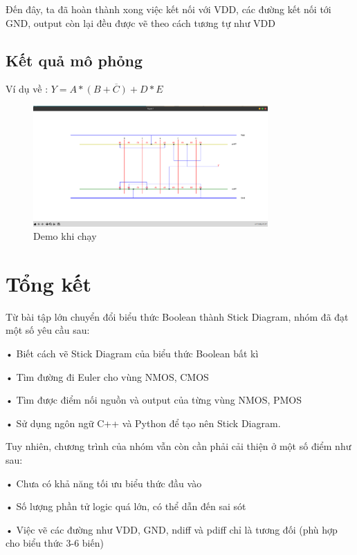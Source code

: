 \documentclass[a4paper,12pt]{article}
\begin{document}
Đến đây, ta đã hoàn thành xong việc kết nối với VDD, các đường kết nối tới GND, output còn lại đều được vẽ theo cách tương tự như VDD
\subsection{Kết quả mô phỏng}
Ví dụ về : \( Y = \overline{A *(B + C) + D * E} \)

\begin{figure}[H]
    \centering
    \includegraphics[width=0.8\textwidth]{../PNG/DEMO_Real.png}
    \caption{Demo khi chạy}
    \label{fig:DEMO}
\end{figure}
\newpage
\section{Tổng kết}
Từ bài tập lớn chuyển đổi biểu thức Boolean thành Stick Diagram, nhóm đã đạt một số yêu cầu sau:

• Biết cách vẽ Stick Diagram của biểu thức Boolean bất kì

• Tìm đường đi Euler cho vùng NMOS, CMOS

• Tìm được điểm nối nguồn và output của từng vùng NMOS, PMOS

• Sử dụng ngôn ngữ C++ và Python để tạo nên Stick Diagram.

Tuy nhiên, chương trình của nhóm vẫn còn cần phải cải thiện ở một số điểm như sau: 

• Chưa có khả năng tối ưu biểu thức đầu vào

• Số lượng phần tử logic quá lớn, có thể dẫn đến sai sót

• Việc vẽ các đường như VDD, GND, ndiff và pdiff chỉ là tương đối (phù hợp cho biểu thức 3-6 biến)
\end{document}
